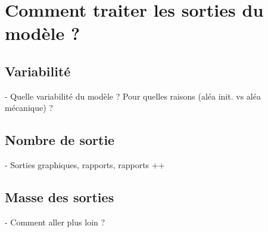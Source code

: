 \documentclass[12pt, a4paper, oneside]{book}
\begin{document}
	\section{Comment traiter les sorties du modèle ?}
	\subsection{Variabilité}
	- Quelle variabilité du modèle ? Pour quelles raisons (aléa init. vs aléa mécanique) ?
	\subsection{Nombre de sortie}
	- Sorties graphiques, rapports, rapports ++
	\subsection{Masse des sorties}
	- Comment aller plus loin ?
	
	\printbibliography 
	
\end{document}

